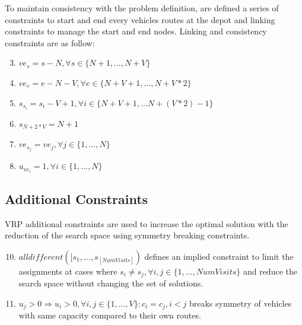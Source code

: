 To maintain consistency with the problem definition, are defined a series of constraints to start and end every vehicles routes at the depot and linking constraints to manage the start and end nodes.\newline
Linking and consistency constraints are as follow:
\begin{enumerate}
 \setcounter{enumi}{2}
    \item \begin{math} ve_{s} = s - N,  \forall s \in \{N+1, ..., N + V\}\end{math}
    \item \begin{math}ve_{e} = e - N - V, \forall e \in \{N + V + 1, ..., N + V * 2\}\end{math}
    \item \begin{math}s_{s_{i}} = s_{i} - V + 1, \forall i \in \{N + V + 1,...N + (V * 2) - 1\} \end{math}
    \item \begin{math}s_{N + 2 * V} = N + 1\end{math}
    \item \begin{math}ve_{s_{j}} = ve_{j}, \forall j \in \{1,..., N\}\end{math}
    \item \begin{math}u_{ve_{i}} = 1, \forall i \in \{1,...,N\}\end{math}
\end{enumerate}
\subsection{Additional Constraints}
VRP additional constraints are used to increase the optimal solution with the reduction of the search space using symmetry breaking constraints.

\begin{enumerate}
 \setcounter{enumi}{9}
    \item \begin{math}alldifferent([s_{1},...,s_[NumVisits])\end{math} defines an implied constraint to limit the assignments at cases where \begin{math}s_{i} \neq s_{j}, \forall i,j \in \{1,...,NumVisits\}\end{math} and reduce the search space without changing the set of solutions.
    \item \begin{math}u_{j} > 0 \Rightarrow u_{i} > 0, \forall i,j \in \{1,...,V\} : c_{i} = c_{j}, i < j\end{math} breaks symmetry of vehicles with same capacity compared to their own routes.
\end{enumerate}
\newpage
